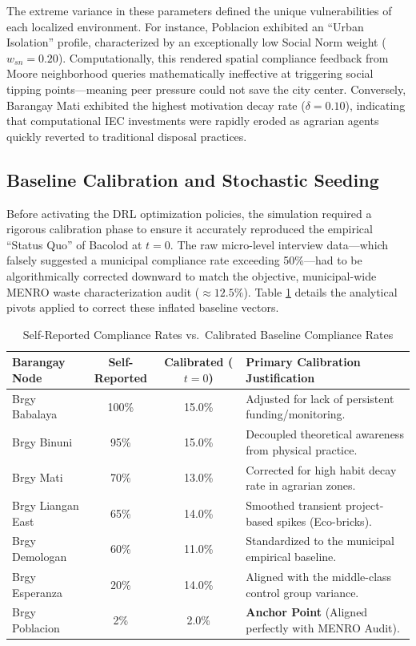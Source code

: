 The extreme variance in these parameters defined the unique vulnerabilities of each localized environment. For instance, Poblacion exhibited an ``Urban Isolation'' profile, characterized by an exceptionally low Social Norm weight ($w_{sn} = 0.20$). Computationally, this rendered spatial compliance feedback from Moore neighborhood queries mathematically ineffective at triggering social tipping points—meaning peer pressure could not save the city center. Conversely, Barangay Mati exhibited the highest motivation decay rate ($\delta = 0.10$), indicating that computational IEC investments were rapidly eroded as agrarian agents quickly reverted to traditional disposal practices.

\subsection{Baseline Calibration and Stochastic Seeding}
Before activating the DRL optimization policies, the simulation required a rigorous calibration phase to ensure it accurately reproduced the empirical ``Status Quo'' of Bacolod at $t=0$. The raw micro-level interview data—which falsely suggested a municipal compliance rate exceeding 50\%—had to be algorithmically corrected downward to match the objective, municipal-wide MENRO waste characterization audit ($\approx 12.5\%$). Table \ref{tab:calibration_data} details the analytical pivots applied to correct these inflated baseline vectors.

\begin{table}[htbp]
    \centering
    \caption{Self-Reported Compliance Rates vs.\ Calibrated Baseline Compliance Rates}
    \label{tab:calibration_data}
    \small
    \begin{tabular}{l c c p{4.5cm}}
        \toprule
        \textbf{Barangay Node} & \textbf{Self-Reported} & \textbf{Calibrated ($t=0$)} & \textbf{Primary Calibration Justification} \\
        \midrule
        Brgy Babalaya     & 100\% & 15.0\% & Adjusted for lack of persistent funding/monitoring. \\
        Brgy Binuni       & 95\%  & 15.0\% & Decoupled theoretical awareness from physical practice. \\
        Brgy Mati         & 70\%  & 13.0\% & Corrected for high habit decay rate in agrarian zones. \\
        Brgy Liangan East & 65\%  & 14.0\% & Smoothed transient project-based spikes (Eco-bricks). \\
        Brgy Demologan    & 60\%  & 11.0\% & Standardized to the municipal empirical baseline. \\
        Brgy Esperanza    & 20\%  & 14.0\% & Aligned with the middle-class control group variance. \\
        Brgy Poblacion    & 2\%   & 2.0\%  & \textbf{Anchor Point} (Aligned perfectly with MENRO Audit). \\
        \bottomrule
    \end{tabular}
\end{table}

